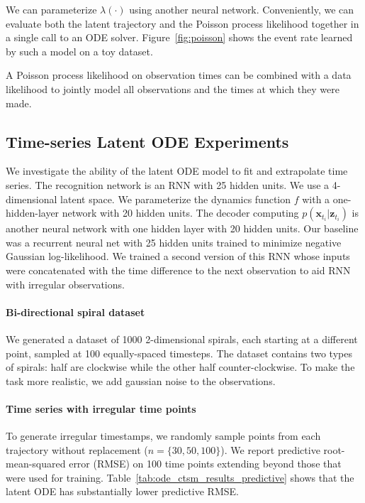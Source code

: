 \documentclass{article}
\newcommand{\vx}{\mathbf{x}}
\newcommand{\vz}{\mathbf{z}}
\newcommand{\latent}{\vz}
\newcommand{\lograte}{\lambda}%
\begin{document}
%
We can parameterize $\lograte(\cdot)$ using another neural network.
Conveniently, we can evaluate both the latent trajectory and the Poisson process likelihood together in a single call to an ODE solver.
Figure~\ref{fig:poisson} shows the event rate learned by such a model on a toy dataset.

A Poisson process likelihood on observation times
can be combined with a data likelihood 
to jointly model all observations and the times at which they were made.


\subsection{Time-series Latent ODE Experiments}
We investigate the ability of the latent ODE model to fit and extrapolate time series.
The recognition network is an RNN with 25 hidden units.
We use a 4-dimensional latent space.
We parameterize the dynamics function $f$ with a one-hidden-layer network with 20 hidden units.
The decoder computing $p(\vx_{t_i}|\latent_{t_i})$ is another neural network with one hidden layer with 20 hidden units.
Our baseline was a recurrent neural net with 25 hidden units trained to minimize negative Gaussian log-likelihood.
We trained a second version of this RNN whose inputs were concatenated with the time difference to the next observation to aid RNN with irregular observations.%



\paragraph{Bi-directional spiral dataset}
We generated a dataset of 1000 2-dimensional spirals, each starting at a different point, sampled at 100 equally-spaced timesteps.
The dataset contains two types of spirals: half are clockwise while the other half counter-clockwise.
To make the task more realistic, we add gaussian noise to the observations.


\paragraph{Time series with irregular time points}

To generate irregular timestamps, we randomly sample points from each trajectory without replacement ($n=\{30, 50, 100\}$).
We report predictive root-mean-squared error (RMSE) on 100 time points extending beyond those that were used for training.
Table~\ref{tab:ode_ctsm_results_predictive} shows that the latent ODE has substantially lower predictive RMSE.
\end{document}
